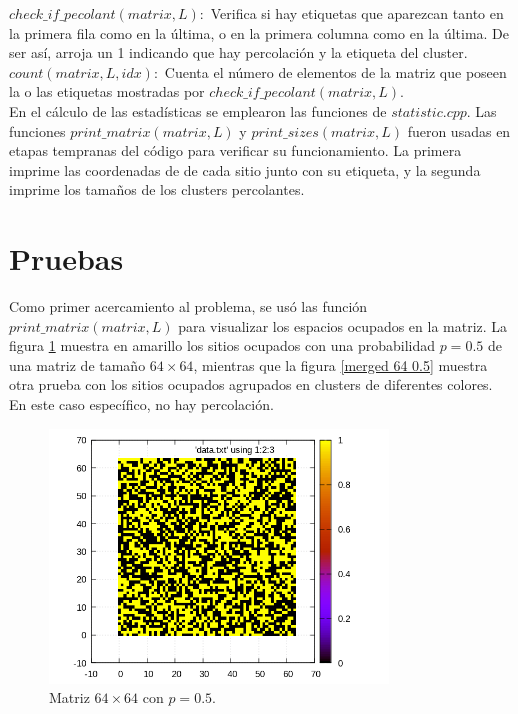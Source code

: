 \documentclass[10pt,twocolumn]{article}
\begin{document}
    $check\_if\_pecolant(matrix, L):$ Verifica si hay etiquetas que aparezcan tanto en la primera fila como en la última, o
    en la primera columna como en la última. De ser así, arroja un 1 indicando que hay percolación y la etiqueta del cluster.\\
    
    $count(matrix, L, idx):$ Cuenta el número de elementos de la matriz que poseen la o las etiquetas mostradas por
    $check\_if\_pecolant(matrix, L)$.\\

    En el cálculo de las estadísticas se emplearon las funciones de $statistic.cpp$. Las funciones $print\_matrix(matrix, L)$
    y $print\_sizes(matrix, L)$ fueron usadas en etapas tempranas del código para verificar su funcionamiento. La primera 
    imprime las coordenadas de de cada sitio junto con su etiqueta, y la segunda imprime los tamaños de los clusters
    percolantes.\\ 

\section{Pruebas}
    Como primer acercamiento al problema, se usó las función $print\_matrix(matrix, L)$ para visualizar los espacios ocupados
    en la matriz. La figura \ref{64 0.5} muestra en amarillo los sitios ocupados con una probabilidad $p = 0.5$ de una matriz
    de tamaño $64\times 64$, mientras que la figura \ref{merged 64 0.5} muestra otra prueba con los sitios ocupados agrupados
    en clusters de diferentes colores. En este caso específico, no hay percolación. 
   \begin{figure}[H]
    \centering
    \includegraphics[width=9cm]{data/64 0.5.png}
    \caption{Matriz $64\times 64$ con $p = 0.5$.}
    \label{64 0.5} 
   \end{figure} 
\end{document}
